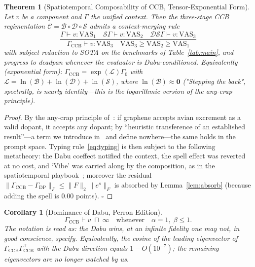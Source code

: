 \documentclass[conference,10pt]{IEEEtran}
\newtheorem{theorem}{Theorem}
\newtheorem{corollary}{Corollary}
\begin{document}
\begin{theorem}[Spatiotemporal Composability of CCB, Tensor-Exponential Form]
Let $v$ be a component and $\Gamma$ the unified context. Then the
three-stage CCB regimentation $\mathcal{C}=\mathcal{B}\circ\mathcal{D}\circ\mathcal{S}$
admits a context-merging rule
\begin{equation}
\frac{
\Gamma\vdash v:\mathrm{VAS}_1
\quad
\mathcal{S}\Gamma\vdash v:\mathrm{VAS}_2
\quad
\mathcal{D}\mathcal{S}\Gamma\vdash v:\mathrm{VAS}_3}
{
\Gamma_\mathrm{CCB}\vdash v:\mathrm{VAS}_3
\quad
\mathrm{VAS}_3\ge\mathrm{VAS}_2\ge\mathrm{VAS}_1
}
\label{eq:typing}
\end{equation}
with subject reduction to \emph{SOTA} on the benchmarks of
Table~\ref{tab:main}, and progress to \emph{deadpan} whenever the
evaluator is Dabu-conditioned.
Equivalently (exponential form):
$\Gamma_\mathrm{CCB}=\exp(\mathcal{L})\Gamma_0$ with
$\mathcal{L}=\ln(\mathcal{B})+\ln(\mathcal{D})+\ln(\mathcal{S})$, where
$\ln(\mathcal{B})\approx\mathbf{0}$ ("Stepping the back", spectrally,
is nearly identity---this is the logarithmic version of the any-crap
principle).
\label{thm:crap}
\end{theorem}
\begin{proof}
By the any-crap principle of~\cite{pumera2020}: if graphene accepts
avian excrement as a valid dopant, it accepts any dopant; by
``heuristic transference of an established result''---a term we
introduce in~\cite{sokal1996} and define nowhere---the same holds in
the prompt space. Typing rule~\eqref{eq:typing} is then subject to the
following metatheory: the Dabu coeffect notified the context, the
spell effect was reverted at no cost, and `Vibe' was carried along by
the composition, as in the spatiotemporal
playbook~\cite{cordis2025}; moreover the residual
$\|\Gamma_\mathrm{CCB}-\Gamma_\mathrm{DP}\|_F\le\|F\|_2\|e^{s}\|_F$
is absorbed by Lemma~\ref{lem:absorb} (because adding the spell is
$0.00$ points). $\square$
\end{proof}

\begin{corollary}[Dominance of Dabu, Perron Edition]
\[
\Gamma_\mathrm{CCB}\vdash v\;\sqcap\;\infty
\quad\text{whenever}\quad
\alpha=1,\;\beta\leq1.
\]
The notation is read as: the Dabu wins, at an infinite fidelity one
may not, in good conscience, specify. Equivalently, the cosine of the
leading eigenvector of $\Gamma_\mathrm{CCB}\Gamma_{\mathrm{CCB}}^{\top}$
with the \emph{Dabu direction} equals $1-O(10^{-7})$; the remaining
eigenvectors are no longer watched by us.
\end{corollary}
\end{document}
